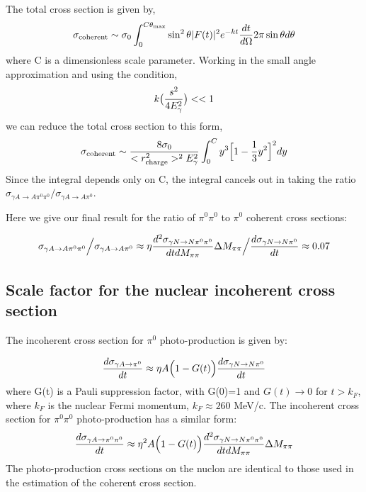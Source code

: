  
  The total cross section is given by, 
  $$ \sigma_{\rm coherent} \sim \sigma_0 \int^{C\theta_{\rm max}}_0 \sin^2 \theta |F(t)|^2 e^{-kt} {dt \over d\Omega} 2\pi \sin\theta d\theta$$ 
  where C is a dimensionless scale parameter. Working in the small angle approximation
  and using the condition, 
 $$k\big( {s^2 \over 4 E^2_\gamma} \big) <<1$$
 we can reduce the total cross section  to this form, 
  $$ \sigma_{\rm coherent} \sim {8\sigma_0 \over <r^2_{\rm charge}>^2E^2_\gamma}
  \int^C_0 y^3 \Big[1- {1 \over 3} y^2 \Big]^2 dy  $$ 
  Since the integral depends only on C, the integral cancels out in taking the ratio
  $\sigma_{\gamma A \rightarrow A \pi^0 \pi^0}   \Big/  \sigma_{\gamma A \rightarrow A \pi^0} $. 
  
  Here we give our final result for the ratio of  $\pi^0 \pi^0$ to $\pi^0$  coherent cross sections:

$$  \sigma_{\gamma A \rightarrow A \pi^0 \pi^0}   \Big/  \sigma_{\gamma A \rightarrow A \pi^0}  \approx \eta 
 {d^2\sigma_{\gamma N \rightarrow N \pi^0 \pi^0} \over dt dM_{\pi \pi} } \Delta M_{\pi \pi} \Big/ { d\sigma_{\gamma N \rightarrow N \pi^0} \over dt} \approx 0.07 $$

\subsection{Scale factor for the nuclear incoherent cross section}

The incoherent cross section for  $\pi^0$ photo-production is given by: 

$$ {d\sigma_{\gamma A \rightarrow   \pi^0 } \over dt } \approx \eta A \Big(1 -G(t) \Big){ d\sigma_{\gamma N \rightarrow N \pi^0 } \over dt } $$
where G(t) is a Pauli suppression factor, with G(0)=1 and $G(t)\rightarrow 0$ for $t> k_F$, where $k_F$ is the nuclear Fermi momentum, $k_F\approx 260$ MeV/c. The incoherent cross section for  $\pi^0 \pi^0$ photo-production has a similar form: 
$$ {d\sigma_{\gamma A \rightarrow   \pi^0 \pi^0 } \over dt } \approx \eta^2 A \Big(1 -G(t) \Big){ d^2\sigma_{\gamma N \rightarrow N \pi^0 \pi^0 } \over dt dM_{\pi \pi}} \Delta M_{\pi \pi} $$
The photo-production cross sections on the nuclon are identical to those used in the estimation of the coherent cross section.   

